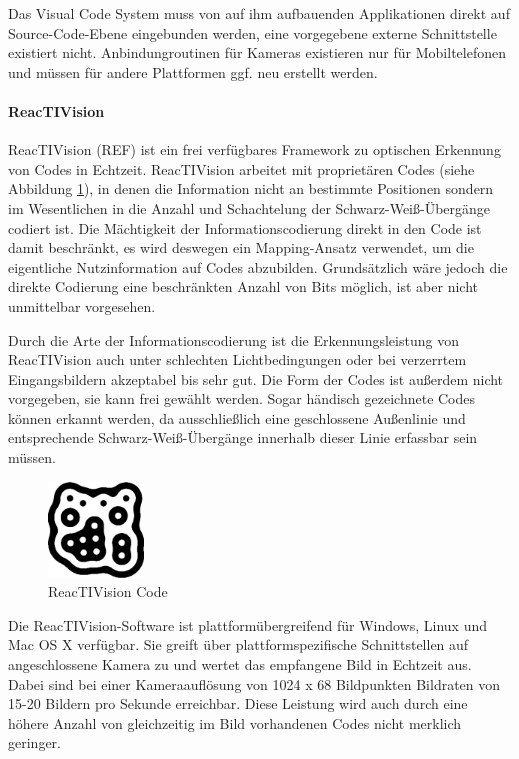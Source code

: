 Das Visual Code System muss von auf ihm aufbauenden Applikationen direkt auf Source-Code-Ebene eingebunden werden, eine vorgegebene externe Schnittstelle existiert nicht. Anbindungroutinen für Kameras existieren nur für Mobiltelefonen und müssen für andere Plattformen ggf. neu erstellt werden.


\paragraph{ReacTIVision}\label{par:reactivision}
ReacTIVision (REF) ist ein frei verfügbares Framework zu optischen Erkennung von Codes in Echtzeit. ReacTIVision arbeitet mit proprietären Codes (siehe Abbildung \ref{fig:img_ImplementierungInput_ReactivisionCode}), in denen die Information nicht an bestimmte Positionen sondern im Wesentlichen in die Anzahl und Schachtelung der Schwarz-Weiß-Übergänge codiert ist. Die Mächtigkeit der Informationscodierung direkt in den Code ist damit beschränkt, es wird deswegen ein Mapping-Ansatz verwendet, um die eigentliche Nutzinformation auf Codes abzubilden. Grundsätzlich wäre jedoch die direkte Codierung eine beschränkten Anzahl von Bits möglich, ist aber nicht unmittelbar vorgesehen.

Durch die Arte der Informationscodierung ist die Erkennungsleistung von ReacTIVision auch unter schlechten Lichtbedingungen oder bei verzerrtem Eingangsbildern akzeptabel bis sehr gut. Die Form der Codes ist außerdem nicht vorgegeben, sie kann frei gewählt werden. Sogar händisch gezeichnete Codes können erkannt werden, da ausschließlich eine geschlossene Außenlinie und entsprechende Schwarz-Weiß-Übergänge innerhalb dieser Linie erfassbar sein müssen.

\begin{figure}[htbp]
	\centering
		\includegraphics[height=1in]{img/ImplementierungInput/ReactivisionCode.png}
	\caption{ReacTIVision Code}
	\label{fig:img_ImplementierungInput_ReactivisionCode}
\end{figure}

Die ReacTIVision-Software ist plattformübergreifend für Windows, Linux und Mac OS X verfügbar. Sie greift über plattformspezifische Schnittstellen auf angeschlossene Kamera zu und wertet das empfangene Bild in Echtzeit aus. Dabei sind bei einer Kameraauflösung von 1024 x 68 Bildpunkten Bildraten von 15-20 Bildern pro Sekunde erreichbar. Diese Leistung wird auch durch eine höhere Anzahl von gleichzeitig im Bild vorhandenen Codes nicht merklich geringer.

